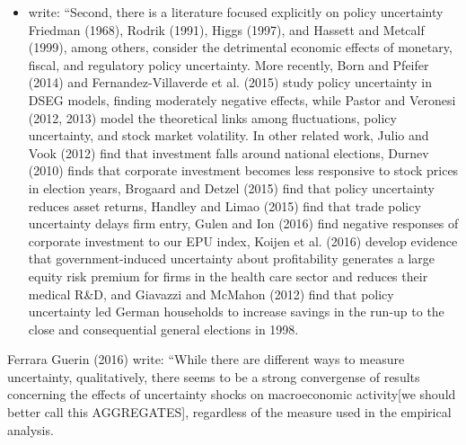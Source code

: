 \documentclass[a4paper,11pt,listof=nochaptergap,oneside,pointednumbers,bibtotoc,bigheadings,liststotoc]{scrbook}
\begin{document}
\begin{itemize}
	\item \citet[p. 1597]{bakeretal:15} write: ``Second, there is a literature focused explicitly on policy uncertainty Friedman (1968), Rodrik (1991), Higgs (1997), and Hassett and Metcalf (1999), among others, consider the detrimental economic effects of monetary, fiscal, and regulatory policy uncertainty. More recently, Born and Pfeifer (2014) and Fernandez-Villaverde et al. (2015) study policy uncertainty in DSEG models, finding moderately negative effects, while Pastor and Veronesi (2012, 2013) model the theoretical links among fluctuations, policy uncertainty, and stock market volatility. In other related work, Julio and Vook (2012) find that investment falls around national elections, Durnev (2010) finds that corporate investment becomes less responsive to stock prices in election years, Brogaard and Detzel (2015) find that policy uncertainty reduces asset returns, Handley and Limao (2015) find that trade policy uncertainty delays firm entry, Gulen and Ion (2016) find negative responses of corporate investment to our EPU index, Koijen et al. (2016) develop evidence that government-induced uncertainty about profitability generates a large equity risk premium for firms in the health care sector and reduces their medical R\&D, and Giavazzi and McMahon (2012) find that policy uncertainty led German households to increase savings in the run-up to the close and consequential general elections in 1998. 
\end{itemize}
\endgroup

Ferrara Guerin (2016) write: “While there are different ways to measure uncertainty, qualitatively, there seems to be a strong convergense of results concerning the effects of uncertainty shocks on macroeconomic activity[we should better call this AGGREGATES], regardless of the measure used in the empirical analysis.
\end{document}

